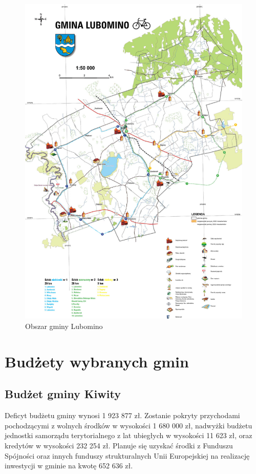 \documentclass[a4paper,10pt]{article}
\begin{document}
    \begin{figure}[!htb]
    \centering
	\includegraphics[scale=0.2]{pics/mapa4.jpg}
	\caption{Obszar gminy Lubomino}
    \end{figure}
    
\section{Budżety wybranych gmin}
  \subsection{Budżet gminy Kiwity}
    
    Deficyt budżetu gminy wynosi 1 923 877 zł. 
    Zostanie pokryty przychodami pochodzącymi z wolnych środków w wysokości 1 680 000 zł, 
    nadwyżki budżetu jednostki samorządu terytorialnego z lat ubiegłych w wysokości 11 623 zł, oraz kredytów w wysokości 232 254 zł.
    Planuje się uzyskać środki z Funduszu Spójności oraz innych funduszy strukturalnych Unii Europejskiej na realizację inwestycji w gminie na kwotę 652 636 zł.
    
\end{document}
